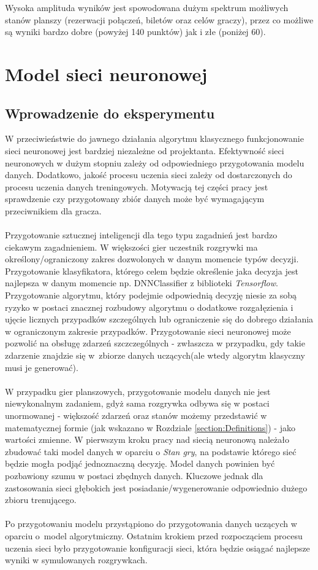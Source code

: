 \documentclass[12pt, oneside]{report}
\begin{document}
Wysoka amplituda wyników jest spowodowana dużym spektrum możliwych stanów planszy (rezerwacji połączeń, biletów oraz celów graczy), przez co możliwe są wyniki bardzo dobre (powyżej 140 punktów) jak i złe (poniżej 60). 
\chapter{Model sieci neuronowej}
\section{Wprowadzenie do eksperymentu}
W przeciwieństwie do jawnego działania algorytmu klasycznego 
funkcjonowanie sieci neuronowej jest bardziej niezależne od projektanta. Efektywność sieci neuronowych w dużym stopniu zależy od odpowiedniego przygotowania modelu danych. Dodatkowo, jakość procesu uczenia sieci zależy od dostarczonych do procesu uczenia danych treningowych. Motywacją tej części pracy jest sprawdzenie czy przygotowany zbiór danych może być wymagającym przeciwnikiem dla gracza. \\ \\
Przygotowanie sztucznej inteligencji dla tego typu zagadnień jest bardzo ciekawym zagadnieniem. W większości gier uczestnik rozgrywki ma określony/ograniczony zakres dozwolonych w danym momencie typów decyzji. Przygotowanie klasyfikatora, którego celem będzie określenie jaka decyzja jest najlepsza w danym momencie np. DNNClassifier z biblioteki \textit{Tensorflow}. Przygotowanie algorytmu, który podejmie odpowiednią decyzję niesie za sobą ryzyko w postaci znacznej rozbudowy algorytmu o dodatkowe rozgałęzienia i ujęcie licznych przypadków szczególnych lub ograniczenie się do dobrego działania w ograniczonym zakresie przypadków. Przygotowanie sieci neuronowej może pozwolić na obsługę zdarzeń szczczególnych - zwłaszcza w przypadku, gdy takie zdarzenie znajdzie się w~zbiorze danych uczących(ale wtedy algorytm klasyczny musi je generować).
 \\ \\ W przypadku gier planszowych, przygotowanie modelu danych nie jest niewykonalnym zadaniem, gdyż sama rozgrywka odbywa się w postaci unormowanej - większość zdarzeń oraz stanów możemy przedstawić w matematycznej formie (jak wskazano w Rozdziale \ref{section:Definitions}) - jako wartości zmienne. W pierwszym kroku pracy nad siecią neuronową należało zbudować taki model danych w oparciu o \textit{Stan gry}, na podstawie którego sieć będzie mogła podjąć jednoznaczną decyzję. Model danych powinien być pozbawiony szumu w postaci zbędnych danych.
 Kluczowe jednak dla zastosowania sieci głębokich jest posiadanie/wygenerowanie odpowiednio dużego zbioru trenującego.
 \\ \\ Po przygotowaniu modelu przystąpiono do przygotowania danych uczących w oparciu o~model algorytmiczny. Ostatnim krokiem przed rozpocząciem procesu uczenia sieci było przygotowanie konfiguracji sieci, która będzie osiągać najlepsze wyniki w symulowanych rozgrywkach.
\end{document}
